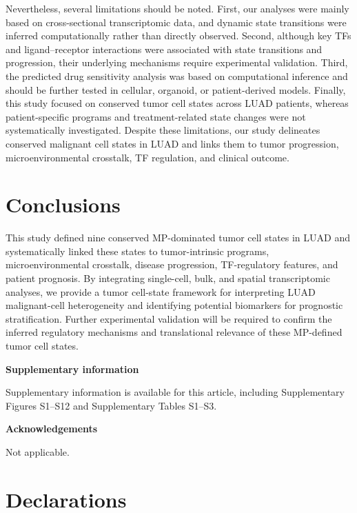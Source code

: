 \documentclass[pdflatex,sn-mathphys-num]{sn-jnl}%
\theoremstyle{thmstyleone}%
\theoremstyle{thmstyletwo}%
\theoremstyle{thmstylethree}%
\begin{document}
Nevertheless, several limitations should be noted. First, our analyses were mainly based on cross-sectional transcriptomic data, and dynamic state transitions were inferred computationally rather than directly observed. Second, although key TFs and ligand--receptor interactions were associated with state transitions and progression, their underlying mechanisms require experimental validation. Third, the predicted drug sensitivity analysis was based on computational inference and should be further tested in cellular, organoid, or patient-derived models. Finally, this study focused on conserved tumor cell states across LUAD patients, whereas patient-specific programs and treatment-related state changes were not systematically investigated. Despite these limitations, our study delineates conserved malignant cell states in LUAD and links them to tumor progression, microenvironmental crosstalk, TF regulation, and clinical outcome.

\section{Conclusions}\label{sec13}

This study defined nine conserved MP-dominated tumor cell states in LUAD and systematically linked these states to tumor-intrinsic programs, microenvironmental crosstalk, disease progression, TF-regulatory features, and patient prognosis. By integrating single-cell, bulk, and spatial transcriptomic analyses, we provide a tumor cell-state framework for interpreting LUAD malignant-cell heterogeneity and identifying potential biomarkers for prognostic stratification. Further experimental validation will be required to confirm the inferred regulatory mechanisms and translational relevance of these MP-defined tumor cell states.

\backmatter

\noindent\textbf{Supplementary information}

Supplementary information is available for this article, including Supplementary Figures S1--S12 and Supplementary Tables S1--S3.

\noindent\textbf{Acknowledgements}

Not applicable.

\section*{Declarations}
\end{document}

